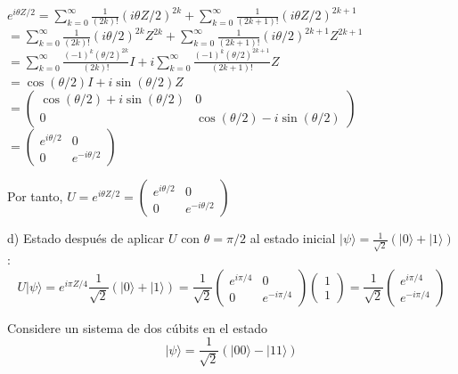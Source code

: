 \begin{questions}
\begin{solution}
    $e^{i\theta Z/2} = \sum_{k=0}^{\infty} \frac{1}{(2k)!}(i\theta Z/2)^{2k} + \sum_{k=0}^{\infty} \frac{1}{(2k+1)!}(i\theta Z/2)^{2k+1}$
    $= \sum_{k=0}^{\infty} \frac{1}{(2k)!}(i\theta/2)^{2k}Z^{2k} + \sum_{k=0}^{\infty} \frac{1}{(2k+1)!}(i\theta/2)^{2k+1}Z^{2k+1}$
    $= \sum_{k=0}^{\infty} \frac{(-1)^k(\theta/2)^{2k}}{(2k)!}I + i\sum_{k=0}^{\infty} \frac{(-1)^k(\theta/2)^{2k+1}}{(2k+1)!}Z$
    $= \cos(\theta/2)I + i\sin(\theta/2)Z$
    $= \begin{pmatrix} \cos(\theta/2) + i\sin(\theta/2) & 0 \\ 0 & \cos(\theta/2) - i\sin(\theta/2) \end{pmatrix}$
    $= \begin{pmatrix} e^{i\theta/2} & 0 \\ 0 & e^{-i\theta/2} \end{pmatrix}$

    Por tanto, $U = e^{i\theta Z/2} = \begin{pmatrix} e^{i\theta/2} & 0 \\ 0 & e^{-i\theta/2} \end{pmatrix}$

    d) Estado después de aplicar $U$ con $\theta = \pi/2$ al estado inicial $|\psi\rangle = \frac{1}{\sqrt{2}}(|0\rangle + |1\rangle)$:
    \[
      U|\psi\rangle = e^{i\pi Z/4} \frac{1}{\sqrt{2}}(|0\rangle + |1\rangle)
      = \frac{1}{\sqrt{2}}\begin{pmatrix} e^{i\pi/4} & 0 \\ 0 & e^{-i\pi/4} \end{pmatrix} \begin{pmatrix} 1 \\ 1 \end{pmatrix} = \frac{1}{\sqrt{2}}\begin{pmatrix} e^{i\pi/4} \\ e^{-i\pi/4} \end{pmatrix}
    \]
  \end{solution}
  \question[3] Considere un sistema de dos cúbits en el estado
  \[|\psi\rangle = \frac{1}{\sqrt{2}}(|00\rangle - |11\rangle)\]
\end{questions}
